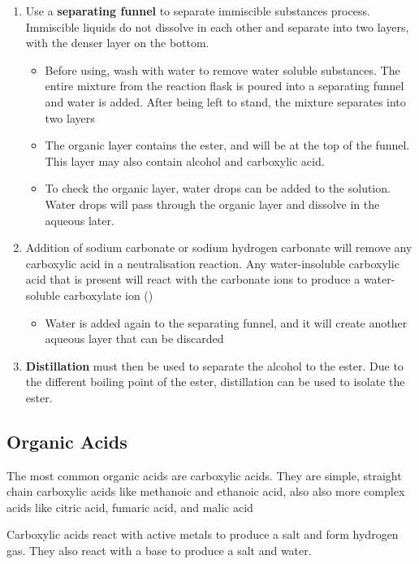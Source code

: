 				\begin{enumerate}
					\item Use a \textbf{separating funnel} to separate immiscible substances process. Immiscible liquids do not dissolve in each other and separate into two layers, with the denser layer on the bottom.
						\begin{itemize}
							\item Before using, wash with water to remove water soluble substances. The entire mixture from the reaction flask is poured into a separating funnel and water is added. After being left to stand, the mixture separates into two layers
							\item The organic layer contains the ester, and will be at the top of the funnel. This layer may also contain alcohol and carboxylic acid.
							\item To check the organic layer, water drops can be added to the solution. Water drops will pass through the organic layer and dissolve in the aqueous later.
						\end{itemize}
					\item Addition of sodium carbonate or sodium hydrogen carbonate will remove any carboxylic acid in a neutralisation reaction. Any water-insoluble carboxylic acid that is present will react with the carbonate ions to produce a water-soluble carboxylate ion ()
						\begin{itemize}
							\item Water is added again to the separating funnel, and it will create another aqueous layer that can be discarded
						\end{itemize}
					\item \textbf{Distillation} must then be used to separate the alcohol to the ester. Due to the different boiling point of the ester, distillation can be used to isolate the ester.

				\end{enumerate}

	\subsection{Organic Acids}

		The most common organic acids are carboxylic acids. They are simple, straight chain carboxylic acids like methanoic and ethanoic acid, also also more complex acids like citric acid, fumaric acid, and malic acid

		Carboxylic acids react with active metals to produce a salt and form hydrogen gas. They also react with a base to produce a salt and water.

